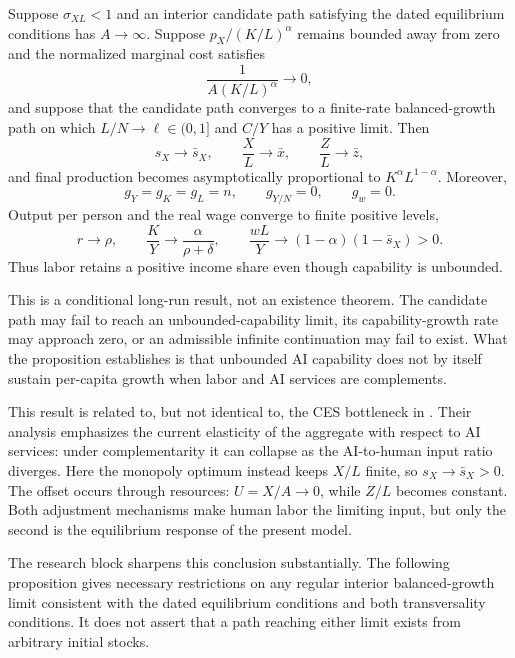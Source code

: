 \begin{proposition}
\label{prop:axm-complements}
Suppose \(\sigma_{XL}<1\) and an interior candidate path satisfying the dated
equilibrium conditions has \(A\to\infty\). Suppose
\(p_X/(K/L)^\alpha\) remains bounded away from zero and the normalized marginal
cost satisfies
\[
 \frac{1}{A(K/L)^\alpha}\to0,
\]
and suppose that the candidate path converges to a finite-rate balanced-growth path
on which \(L/N\to\ell\in(0,1]\) and \(C/Y\) has a positive limit. Then
\begin{equation}
 s_X\to\bar s_X,\qquad \frac{X}{L}\to\bar x,\qquad
 \frac{Z}{L}\to\bar z,
 \label{eq:axm-complement-static-limits}
\end{equation}
and final production becomes asymptotically proportional to
\(K^\alpha L^{1-\alpha}\). Moreover,
\[
 g_Y=g_K=g_L=n,\qquad g_{Y/N}=0,\qquad g_w=0.
\]
Output per person and the real wage converge to finite positive levels,
\begin{equation}
 r\to\rho,\qquad
 \frac{K}{Y}\to\frac{\alpha}{\rho+\delta},\qquad
 \frac{wL}{Y}\to(1-\alpha)(1-\bar s_X)>0.
 \label{eq:axm-complement-factor-limits}
\end{equation}
Thus labor retains a positive income share even though capability is unbounded.
\end{proposition}

This is a conditional long-run result, not an existence theorem. The candidate
path may fail to reach an unbounded-capability limit, its capability-growth rate
may approach zero, or an admissible infinite continuation may fail to exist.
What the proposition establishes is that unbounded AI capability does not by
itself sustain per-capita growth when labor and AI services are complements.

This result is related to, but not identical to, the CES bottleneck in
\citet{davidsonetal2026}. Their analysis emphasizes the current elasticity of the
aggregate with respect to AI services: under complementarity it can collapse as
the AI-to-human input ratio diverges. Here the monopoly optimum instead keeps
\(X/L\) finite, so \(s_X\to\bar s_X>0\). The offset occurs through resources:
\(U=X/A\to0\), while \(Z/L\) becomes constant. Both adjustment mechanisms make
human labor the limiting input, but only the second is the equilibrium response
of the present model.

The research block sharpens this conclusion substantially. The following
proposition gives necessary restrictions on any regular interior
balanced-growth limit consistent with the dated equilibrium conditions and both
transversality conditions. It does not assert that a path reaching either limit
exists from arbitrary initial stocks.

